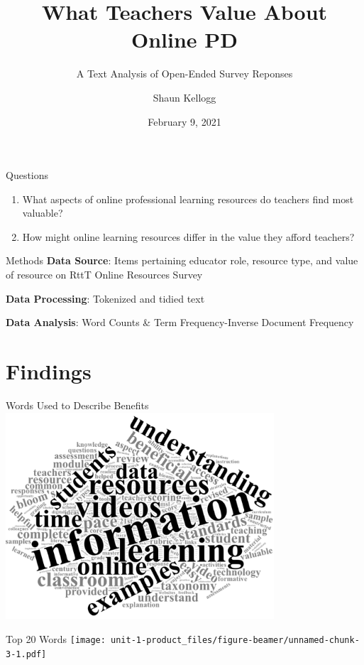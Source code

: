 \documentclass[
  ignorenonframetext,
]{beamer}
\title{What Teachers Value About Online PD}
\subtitle{A Text Analysis of Open-Ended Survey Reponses}
\author{Shaun Kellogg}
\date{February 9, 2021}
\begin{document}
\frame{\titlepage}

\begin{frame}{Questions}
\protect\hypertarget{questions}{}
\begin{enumerate}
\item
  What aspects of online professional learning resources do teachers
  find most valuable?
\item
  How might online learning resources differ in the value they afford
  teachers?
\end{enumerate}
\end{frame}

\begin{frame}{Methods}
\protect\hypertarget{methods}{}
\textbf{Data Source}: Items pertaining educator role, resource type, and
value of resource on RttT Online Resources Survey

\textbf{Data Processing}: Tokenized and tidied text

\textbf{Data Analysis}: Word Counts \& Term Frequency-Inverse Document
Frequency
\end{frame}

\hypertarget{findings}{%
\section{Findings}\label{findings}}

\begin{frame}{Words Used to Describe Benefits}
\protect\hypertarget{words-used-to-describe-benefits}{}
\includegraphics[width=0.75\textwidth,height=\textheight]{img/cloud-clean.png}
\end{frame}

\begin{frame}{Top 20 Words}
\protect\hypertarget{top-20-words}{}
\texttt{[image: unit-1-product\_files/figure-beamer/unnamed-chunk-3-1.pdf]}
\end{frame}
\end{document}
